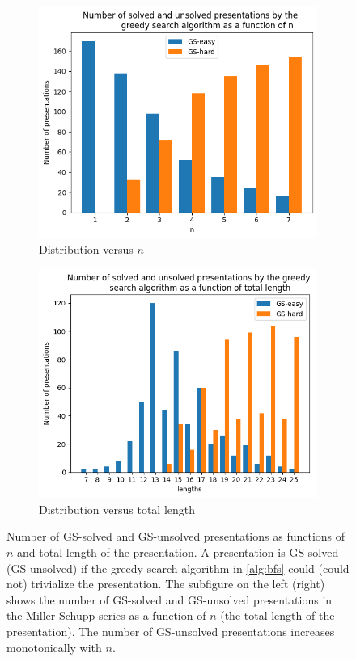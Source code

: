 \begin{figure}
	\centering
	\begin{subfigure}[b]{0.5\textwidth}
		\includegraphics[width=\textwidth]{fig/hist_vs_n.png}
		\caption{Distribution versus $n$}
		\label{fig:hist_vs_n}
	\end{subfigure}%
	\begin{subfigure}[b]{0.5\textwidth}
		\centering
		\includegraphics[width=1.1\textwidth]{fig/hist_vs_lengths.png}
		\caption{Distribution versus total length}
		\label{fig:hist_vs_length}
	\end{subfigure}
	\caption{Number of GS-solved and GS-unsolved presentations as functions of $n$ and total length of the presentation. A presentation is GS-solved (GS-unsolved) if the greedy search algorithm in  \autoref{alg:bfs} could (could not) trivialize the presentation. The subfigure on the left (right) shows the number of GS-solved and GS-unsolved presentations in the Miller-Schupp series as a function of $n$ (the total length of the presentation). The number of GS-unsolved presentations increases monotonically with $n$. } \label{fig:miller_schupp_statistics}
	

\end{figure}
